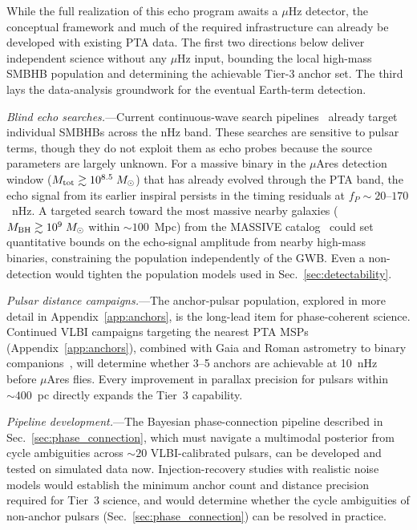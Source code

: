 \documentclass[aps,prx,twocolumn,superscriptaddress,nofootinbib,longbibliography]{revtex4-2}
\newcommand{\Msun}{M_\odot}
\begin{document}
While the full realization of this echo program awaits a $\mu$Hz detector, the conceptual framework and much of the required infrastructure can already be developed with existing PTA data. The first two directions below deliver independent science without any $\mu$Hz input, bounding the local high-mass SMBHB population and determining the achievable Tier-3 anchor set. The third lays the data-analysis groundwork for the eventual Earth-term detection.

\textit{Blind echo searches.}---Current continuous-wave search pipelines~\cite{NG15targeted} already target individual SMBHBs across the nHz band. These searches are sensitive to pulsar terms, though they do not exploit them as echo probes because the source parameters are largely unknown. For a massive binary in the $\mu$Ares detection window ($M_{\rm tot} \gtrsim 10^{8.5}\;\Msun$) that has already evolved through the PTA band, the echo signal from its earlier inspiral persists in the timing residuals at $f_P \sim 20$--$170$~nHz. A targeted search toward the most massive nearby galaxies ($M_{\rm BH} \gtrsim 10^9\;\Msun$ within $\sim100$~Mpc) from the MASSIVE catalog~\cite{Ma2014} could set quantitative bounds on the echo-signal amplitude from nearby high-mass binaries, constraining the population independently of the GWB. Even a non-detection would tighten the population models used in Sec.~\ref{sec:detectability}.

\textit{Pulsar distance campaigns.}---The anchor-pulsar population, explored in more detail in Appendix~\ref{app:anchors}, is the long-lead item for phase-coherent science. Continued VLBI campaigns targeting the nearest PTA MSPs (Appendix~\ref{app:anchors}), combined with Gaia and Roman astrometry to binary companions~\cite{Moran2023,McKinnon2026}, will determine whether 3--5 anchors are achievable at 10~nHz before $\mu$Ares flies. Every improvement in parallax precision for pulsars within $\sim400$~pc directly expands the Tier~3 capability.

\textit{Pipeline development.}---The Bayesian phase-connection pipeline described in Sec.~\ref{sec:phase_connection}, which must navigate a multimodal posterior from cycle ambiguities across $\sim20$ VLBI-calibrated pulsars, can be developed and tested on simulated data now. Injection-recovery studies with realistic noise models would establish the minimum anchor count and distance precision required for Tier~3 science, and would determine whether the cycle ambiguities of non-anchor pulsars (Sec.~\ref{sec:phase_connection}) can be resolved in practice.
\end{document}
